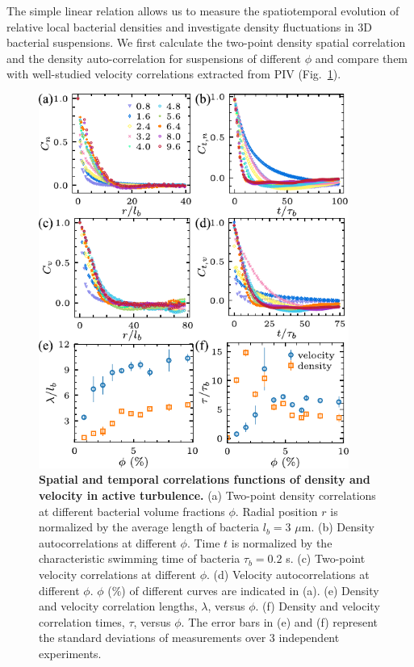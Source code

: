 The simple linear relation allows us to measure the spatiotemporal evolution of relative local bacterial densities and investigate density fluctuations in 3D bacterial suspensions. We first calculate the two-point density spatial correlation and the density auto-correlation for suspensions of different $\phi$ and compare them with well-studied velocity correlations extracted from PIV (Fig.~\ref{fig:spatiotemporal-correlations}).

\begin{figure}[!h]
\begin{center}
\includegraphics[width=4in]{figs/5-GNF/3.pdf}
\caption[Spatial and Temporal Correlation Functions in Active Turbulence]
{
\textbf{Spatial and temporal correlations functions of density and velocity in active turbulence.}
(a) Two-point density correlations at different bacterial volume fractions $\phi$. Radial position $r$ is normalized by the average length of bacteria $l_b = 3$ $\mu$m.
(b) Density autocorrelations at different $\phi$. Time $t$ is normalized by the characteristic swimming time of bacteria $\tau_b = 0.2$ s.
(c) Two-point velocity correlations at different $\phi$.
(d) Velocity autocorrelations at different $\phi$. $\phi$ ($\%$) of different curves are indicated in (a).
(e) Density and velocity correlation lengths, $\lambda$, versus $\phi$.
(f) Density and velocity correlation times, $\tau$, versus $\phi$.
The error bars in (e) and (f) represent the standard deviations of measurements over 3 independent experiments.
}
\label{fig:spatiotemporal-correlations}
\end{center}
\end{figure}

